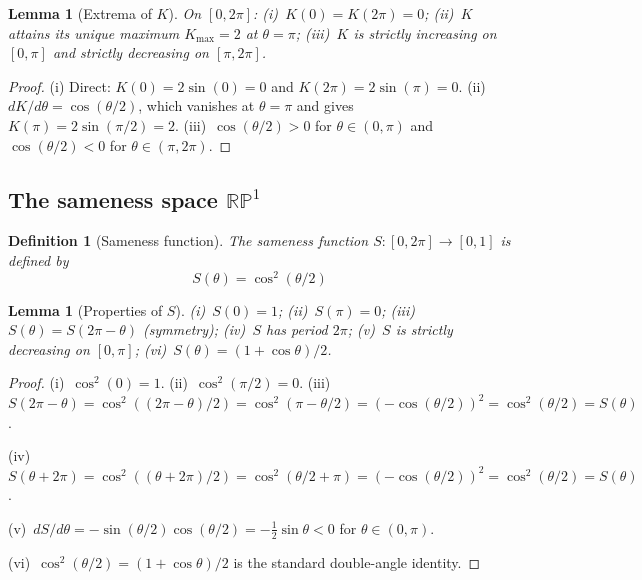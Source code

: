 \documentclass[11pt,letterpaper]{article}
\newtheorem{lemma}[theorem]{Lemma}
\newtheorem{definition}[theorem]{Definition}
\begin{document}
\begin{lemma}[Extrema of $K$]\label{lem:Kextrema}
On $[0, 2\pi]$: (i)~$K(0) = K(2\pi) = 0$; (ii)~$K$ attains its unique maximum $K_{\max} = 2$ at $\theta = \pi$; (iii)~$K$ is strictly increasing on $[0, \pi]$ and strictly decreasing on $[\pi, 2\pi]$.
\end{lemma}

\begin{proof}
(i) Direct: $K(0) = 2\sin(0) = 0$ and $K(2\pi) = 2\sin(\pi) = 0$. (ii)~$dK/d\theta = \cos(\theta/2)$, which vanishes at $\theta = \pi$ and gives $K(\pi) = 2\sin(\pi/2) = 2$. (iii)~$\cos(\theta/2) > 0$ for $\theta \in (0, \pi)$ and $\cos(\theta/2) < 0$ for $\theta \in (\pi, 2\pi)$.
\end{proof}


\subsection{The sameness space $\mathbb{RP}^1$}

\begin{definition}[Sameness function]\label{def:sameness}
The sameness function $S: [0, 2\pi] \to [0, 1]$ is defined by
\begin{equation}
S(\theta) = \cos^2(\theta/2)
\end{equation}
\end{definition}

\begin{lemma}[Properties of $S$]\label{lem:Sprops}
(i)~$S(0) = 1$; (ii)~$S(\pi) = 0$; (iii)~$S(\theta) = S(2\pi - \theta)$ (symmetry); (iv)~$S$ has period $2\pi$; (v)~$S$ is strictly decreasing on $[0, \pi]$; (vi)~$S(\theta) = (1 + \cos\theta)/2$.
\end{lemma}

\begin{proof}
(i)~$\cos^2(0) = 1$. (ii)~$\cos^2(\pi/2) = 0$. (iii)~$S(2\pi - \theta) = \cos^2((2\pi - \theta)/2) = \cos^2(\pi - \theta/2) = (-\cos(\theta/2))^2 = \cos^2(\theta/2) = S(\theta)$. \checkmark

(iv)~$S(\theta + 2\pi) = \cos^2((\theta + 2\pi)/2) = \cos^2(\theta/2 + \pi) = (-\cos(\theta/2))^2 = \cos^2(\theta/2) = S(\theta)$.

(v)~$dS/d\theta = -\sin(\theta/2)\cos(\theta/2) = -\tfrac{1}{2}\sin\theta < 0$ for $\theta \in (0, \pi)$.

(vi)~$\cos^2(\theta/2) = (1 + \cos\theta)/2$ is the standard double-angle identity.
\end{proof}
\end{document}
